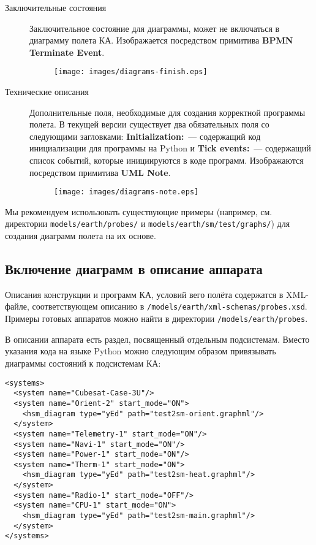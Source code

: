 \documentclass[12pt,a4paper]{article}
\begin{document}
\begin{description}
\item[Заключительные состояния] Заключительное состояние для диаграммы, может не
  включаться в диаграмму полета КА. Изображается посредством примитива \textbf{BPMN
    Terminate Event}.

\begin{figure}[h]
  \begin{center}
    \texttt{[image: images/diagrams-finish.eps]}
  \end{center}
\end{figure}
  
\item[Технические описания] Дополнительные поля, необходимые для создания корректной
  программы полета. В текущей версии существует два обязательных поля со следующими
  загловками: \textbf{Initialization:}~--- содержащий код инициализации для программы на
  Python и \textbf{Tick events:}~--- содержащий список событий, которые инициируются в
  коде программ. Изображаются посредством примитива \textbf{UML Note}.

\begin{figure}[h]
  \begin{center}
    \texttt{[image: images/diagrams-note.eps]}
  \end{center}
\end{figure}

\end{description}

Мы рекомендуем использовать существующие примеры (например, см. директории
\verb'models/earth/probes/' и \verb'models/earth/sm/test/graphs/') для создания диаграмм
полета на их основе.

\subsection*{Включение диаграмм в описание аппарата}

Описания конструкции и программ КА, условий вего полёта содержатся в XML-файле,
соответствующем описанию в \verb'/models/earth/xml-schemas/probes.xsd'. Примеры готовых
аппаратов можно найти в директории \verb'/models/earth/probes'.

В описании аппарата есть раздел, посвященный отдельным подсистемам. Вместо указания кода
на языке Python можно следующим образом привязывать диаграммы состояний к подсистемам КА:

\begin{verbatim}
<systems>
  <system name="Cubesat-Case-3U"/>
  <system name="Orient-2" start_mode="ON">
    <hsm_diagram type="yEd" path="test2sm-orient.graphml"/>
  </system>
  <system name="Telemetry-1" start_mode="ON"/>
  <system name="Navi-1" start_mode="ON"/>
  <system name="Power-1" start_mode="ON"/>
  <system name="Therm-1" start_mode="ON">
    <hsm_diagram type="yEd" path="test2sm-heat.graphml"/>
  </system>
  <system name="Radio-1" start_mode="OFF"/>
  <system name="CPU-1" start_mode="ON">
    <hsm_diagram type="yEd" path="test2sm-main.graphml"/>
  </system>
</systems>
\end{verbatim}
\end{document}
